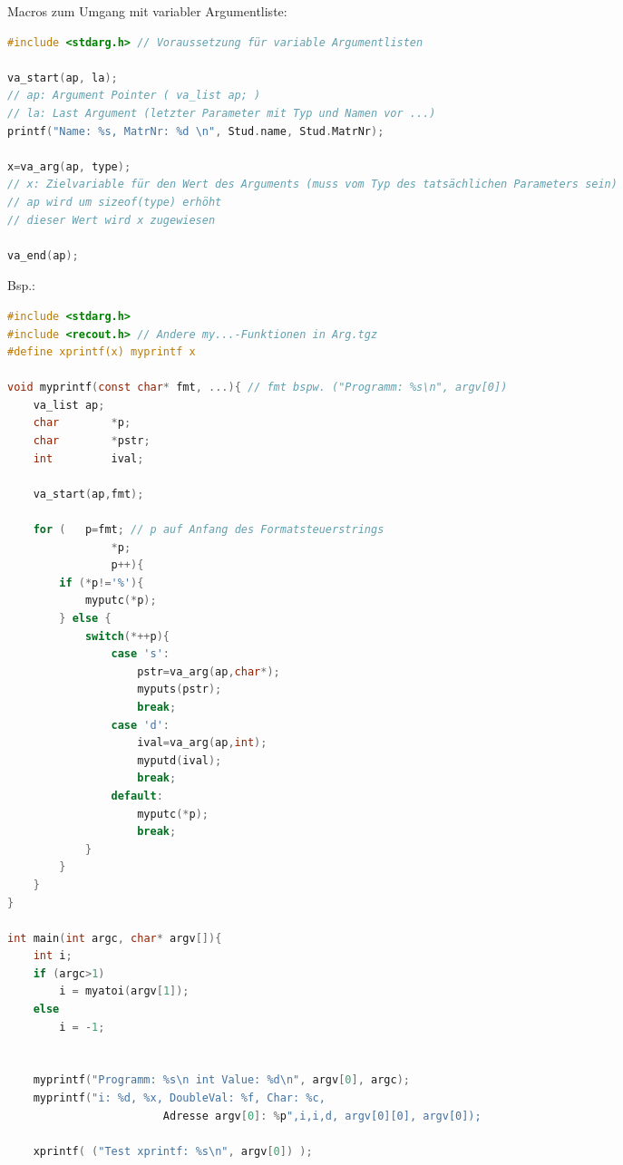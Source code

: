 \begin{multicols*}{3}
Macros zum Umgang mit variabler Argumentliste:
\begin{lstlisting}[language=C]
#include <stdarg.h>	// Voraussetzung für variable Argumentlisten

va_start(ap, la);	
// ap: Argument Pointer ( va_list ap; )
// la: Last Argument (letzter Parameter mit Typ und Namen vor ...)
printf("Name: %s, MatrNr: %d \n", Stud.name, Stud.MatrNr); 

x=va_arg(ap, type);
// x: Zielvariable für den Wert des Arguments (muss vom Typ des tatsächlichen Parameters sein)
// ap wird um sizeof(type) erhöht
// dieser Wert wird x zugewiesen

va_end(ap);
\end{lstlisting}
Bsp.:
\begin{lstlisting}[language=C]
#include <stdarg.h>
#include <recout.h>	// Andere my...-Funktionen in Arg.tgz
#define xprintf(x) myprintf x

void myprintf(const char* fmt, ...){ // fmt bspw. ("Programm: %s\n", argv[0])
	va_list ap;
	char		*p;
	char		*pstr;
	int			ival;
	
	va_start(ap,fmt);
	
	for (	p=fmt; // p auf Anfang des Formatsteuerstrings
				*p;
				p++){
		if (*p!='%'){
			myputc(*p);
		} else {
			switch(*++p){
				case 's':
					pstr=va_arg(ap,char*);
					myputs(pstr);
					break;
				case 'd':
					ival=va_arg(ap,int);
					myputd(ival);
					break;
				default:
					myputc(*p);
					break;
			}
		}
	}
}

int main(int argc, char* argv[]){
	int i;
	if (argc>1)
		i = myatoi(argv[1]);
	else
		i = -1;
		
	
	myprintf("Programm: %s\n int Value: %d\n", argv[0], argc);
	myprintf("i: %d, %x, DoubleVal: %f, Char: %c, 
						Adresse argv[0]: %p",i,i,d, argv[0][0], argv[0]);
						
	xprintf( ("Test xprintf: %s\n", argv[0]) );
\end{lstlisting}
\end{multicols*}


